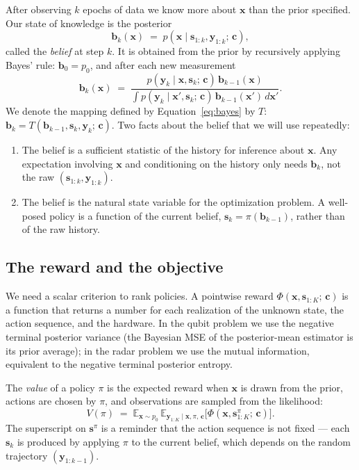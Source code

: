 \documentclass[11pt]{article}
\newcommand{\bc}{\bm{c}}
\newcommand{\bx}{\bm{x}}
\newcommand{\by}{\bm{y}}
\newcommand{\bs}{\bm{s}}
\newcommand{\bb}{\bm{b}}
\newcommand{\E}{\mathbb{E}}
\begin{document}
After observing $k$ epochs of data we know more about $\bx$ than the prior specified.  Our state of knowledge is the posterior
\begin{equation}
\bb_k(\bx) \;=\; p(\bx \mid \bs_{1:k}, \by_{1:k};\, \bc),
\end{equation}
called the \emph{belief} at step $k$.  It is obtained from the prior by recursively applying Bayes' rule: $\bb_0 = p_0$, and after each new measurement
\begin{equation}
\bb_{k}(\bx) \;=\; \frac{p(\by_k \mid \bx, \bs_k;\, \bc)\, \bb_{k-1}(\bx)}{\int p(\by_k \mid \bx', \bs_k;\, \bc)\, \bb_{k-1}(\bx')\, d\bx'}.
\label{eq:bayes}
\end{equation}
We denote the mapping defined by Equation~\eqref{eq:bayes} by $T$: $\bb_k = T(\bb_{k-1}, \bs_k, \by_k;\, \bc)$.  Two facts about the belief that we will use repeatedly:

\begin{enumerate}[nosep, leftmargin=*]
\item The belief is a sufficient statistic of the history for inference about $\bx$.  Any expectation involving $\bx$ and conditioning on the history only needs $\bb_k$, not the raw $(\bs_{1:k}, \by_{1:k})$.
\item The belief is the natural state variable for the optimization problem.  A well-posed policy is a function of the current belief, $\bs_k = \pi(\bb_{k-1})$, rather than of the raw history.
\end{enumerate}

\subsection{The reward and the objective}

We need a scalar criterion to rank policies.  A pointwise reward $\Phi(\bx, \bs_{1:K};\, \bc)$ is a function that returns a number for each realization of the unknown state, the action sequence, and the hardware.  In the qubit problem we use the negative terminal posterior variance (the Bayesian MSE of the posterior-mean estimator is its prior average); in the radar problem we use the mutual information, equivalent to the negative terminal posterior entropy.

The \emph{value} of a policy $\pi$ is the expected reward when $\bx$ is drawn from the prior, actions are chosen by $\pi$, and observations are sampled from the likelihood:
\begin{equation}
V(\pi) \;=\; \E_{\bx \sim p_0}\, \E_{\by_{1:K} \mid \bx, \pi,\, \bc}\!\bigl[\Phi(\bx, \bs_{1:K}^\pi;\, \bc)\bigr].
\label{eq:V_pi}
\end{equation}
The superscript on $\bs^\pi$ is a reminder that the action sequence is not fixed --- each $\bs_k$ is produced by applying $\pi$ to the current belief, which depends on the random trajectory $(\by_{1:k-1})$.
\end{document}

